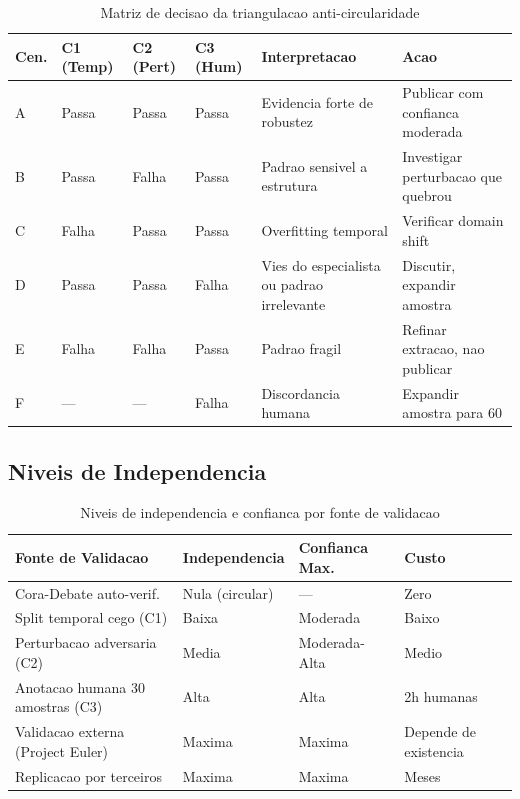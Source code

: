 \begin{table}[H]\centering\footnotesize
\caption{Matriz de decisao da triangulacao anti-circularidade}
\label{tab:triangulacao}
\begin{tabular}{p{}p{}p{}p{}p{}p{}}
\toprule
\textbf{Cen.} & \textbf{C1 (Temp)} & \textbf{C2 (Pert)} & \textbf{C3 (Hum)} & \textbf{Interpretacao} & \textbf{Acao} \\
\midrule
A & Passa & Passa & Passa & Evidencia forte de robustez & Publicar com confianca moderada \\
B & Passa & Falha & Passa & Padrao sensivel a estrutura & Investigar perturbacao que quebrou \\
C & Falha & Passa & Passa & Overfitting temporal & Verificar domain shift \\
D & Passa & Passa & Falha & Vies do especialista ou padrao irrelevante & Discutir, expandir amostra \\
E & Falha & Falha & Passa & Padrao fragil & Refinar extracao, nao publicar \\
F & — & — & Falha & Discordancia humana & Expandir amostra para 60 \\
\bottomrule
\end{tabular}
\end{table}

\subsection{Niveis de Independencia}

\begin{table}[H]\centering\footnotesize
\caption{Niveis de independencia e confianca por fonte de validacao}
\label{tab:independencia}
\begin{tabular}{p{}p{}p{}p{}}
\toprule
\textbf{Fonte de Validacao} & \textbf{Independencia} & \textbf{Confianca Max.} & \textbf{Custo} \\
\midrule
Cora-Debate auto-verif. & Nula (circular) & — & Zero \\
Split temporal cego (C1) & Baixa & Moderada & Baixo \\
Perturbacao adversaria (C2) & Media & Moderada-Alta & Medio \\
Anotacao humana 30 amostras (C3) & Alta & Alta & 2h humanas \\
Validacao externa (Project Euler) & Maxima & Maxima & Depende de existencia \\
Replicacao por terceiros & Maxima & Maxima & Meses \\
\bottomrule
\end{tabular}
\end{table}

